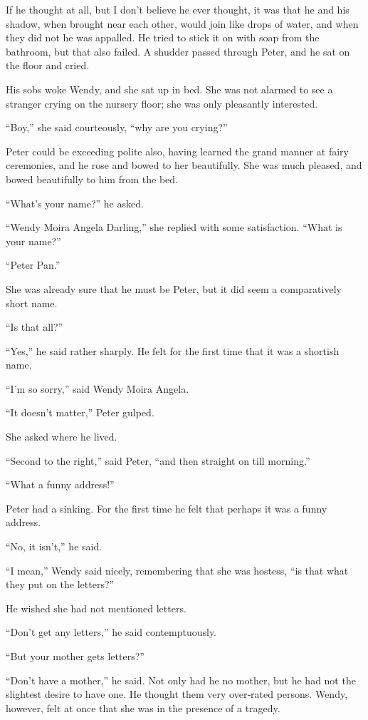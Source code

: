 If he thought at all, but I don’t believe he ever thought,
it was that he and his shadow, when brought near each other, would join like drops of water,
and when they did not he was appalled.
He tried to stick it on with soap from the bathroom, but that also failed.
A shudder passed through Peter, and he sat on the floor and cried.

His sobs woke Wendy, and she sat up in bed.
She was not alarmed to see a stranger crying on the nursery floor;
she was only pleasantly interested.

“Boy,” she said courteously, “why are you crying?”

Peter could be exceeding polite also,
having learned the grand manner at fairy ceremonies,
and he rose and bowed to her beautifully.
She was much pleased, and bowed beautifully to him from the bed.

“What’s your name?\@” he asked.

“Wendy Moira Angela Darling,” she replied with some satisfaction.
“What is your name?”

“Peter Pan.”

She was already sure that he must be Peter,
but it did seem a comparatively short name.

“Is that all?”

“Yes,” he said rather sharply.
He felt for the first time that it was a shortish name.

“I’m so sorry,” said Wendy Moira Angela.

“It doesn’t matter,” Peter gulped.

She asked where he lived.

“Second to the right,” said Peter,
“and then straight on till morning.”

“What a funny address!”

Peter had a sinking.
For the first time he felt that perhaps it was a funny address.

“No, it isn’t,” he said.

“I mean,” Wendy said nicely, remembering that she was hostess,
“is that what they put on the letters?”

He wished she had not mentioned letters.

“Don’t get any letters,” he said contemptuously.

“But your mother gets letters?”

“Don’t have a mother,” he said.
Not only had he no mother, but he had not the slightest desire to have one.
He thought them very over‐rated persons.
Wendy, however, felt at once that she was in the presence of a tragedy.

